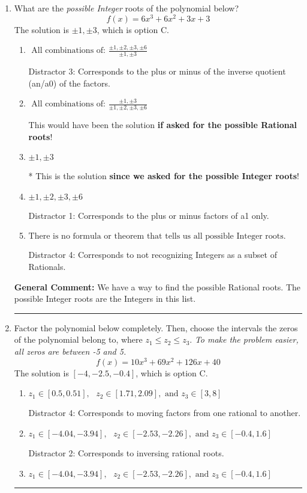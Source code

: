 \documentclass{extbook}[14pt]
\newcommand{\litem}[1]{\item #1

\rule{\textwidth}{0.4pt}}
\begin{document}
\begin{enumerate}\litem{
What are the \textit{possible Integer} roots of the polynomial below?
\[ f(x) = 6x^{3} +6 x^{2} +3 x + 3 \]The solution is \( \pm 1,\pm 3 \), which is option C.\begin{enumerate}[label=\Alph*.]
\item \( \text{ All combinations of: }\frac{\pm 1,\pm 2,\pm 3,\pm 6}{\pm 1,\pm 3} \)

 Distractor 3: Corresponds to the plus or minus of the inverse quotient (an/a0) of the factors. 
\item \( \text{ All combinations of: }\frac{\pm 1,\pm 3}{\pm 1,\pm 2,\pm 3,\pm 6} \)

This would have been the solution \textbf{if asked for the possible Rational roots}!
\item \( \pm 1,\pm 3 \)

* This is the solution \textbf{since we asked for the possible Integer roots}!
\item \( \pm 1,\pm 2,\pm 3,\pm 6 \)

 Distractor 1: Corresponds to the plus or minus factors of a1 only.
\item \( \text{There is no formula or theorem that tells us all possible Integer roots.} \)

 Distractor 4: Corresponds to not recognizing Integers as a subset of Rationals.
\end{enumerate}

\textbf{General Comment:} We have a way to find the possible Rational roots. The possible Integer roots are the Integers in this list.
}
\litem{
Factor the polynomial below completely. Then, choose the intervals the zeros of the polynomial belong to, where $z_1 \leq z_2 \leq z_3$. \textit{To make the problem easier, all zeros are between -5 and 5.}
\[ f(x) = 10x^{3} +69 x^{2} +126 x + 40 \]The solution is \( [-4, -2.5, -0.4] \), which is option C.\begin{enumerate}[label=\Alph*.]
\item \( z_1 \in [0.5, 0.51], \text{   }  z_2 \in [1.71, 2.09], \text{   and   } z_3 \in [3, 8] \)

 Distractor 4: Corresponds to moving factors from one rational to another.
\item \( z_1 \in [-4.04, -3.94], \text{   }  z_2 \in [-2.53, -2.26], \text{   and   } z_3 \in [-0.4, 1.6] \)

 Distractor 2: Corresponds to inversing rational roots.
\item \( z_1 \in [-4.04, -3.94], \text{   }  z_2 \in [-2.53, -2.26], \text{   and   } z_3 \in [-0.4, 1.6] \)


\end{enumerate}}
\end{enumerate}
\end{document}
